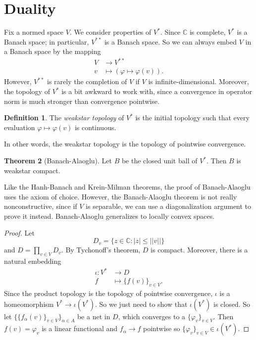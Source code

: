 \documentclass[12pt]{report}
\newcommand{\CC}{\mathbb{C}}
\newcommand{\dfn}[1]{\emph{#1}\index{#1}}
\theoremstyle{definition}
\newtheorem{theorem}{Theorem}[chapter]
\newtheorem{definition}[theorem]{Definition}
\begin{document}
\section{Duality}
    Fix a normed space $V$. We consider properties of $V^*$. Since $\CC$ is complete, $V^*$ is a Banach space; in particular, $V^{**}$ is a Banach space. So we can always embed $V$ in a Banach space by the mapping
\begin{align*}
    V &\to V^{**}\\
    v &\mapsto (\varphi \mapsto \varphi(v)).
\end{align*}
    However, $V^{**}$ is rarely the completion of $V$ if $V$ is infinite-dimensional. Moreover, the topology of $V^*$ is a bit awkward to work with, since a convergence in operator norm is much stronger than convergence pointwise.
\begin{definition}
    The \dfn{weakstar topology} of $V^*$ is the initial topology such that every evaluation $\varphi \mapsto \varphi(v)$ is continuous.
\end{definition}
    In other words, the weakstar topology is the topology of pointwise convergence.
\begin{theorem}[Banach-Alaoglu]
    Let $B$ be the closed unit ball of $V^*$. Then $B$ is weakstar compact.
\end{theorem}
    Like the Hanh-Banach and Krein-Milman theorems, the proof of Banach-Alaoglu uses the axiom of choice. However, the Banach-Alaoglu theorem is not really nonconstructive, since if $V$ is separable, we can use a diagonalization argument to prove it instead. Banach-Alaoglu generalizes to locally convex spaces.
\begin{proof}
    Let
    $$D_v = \{z \in \CC: |z| \leq ||v||\}$$
    and $D = \prod_{v \in V} D_v$. By Tychonoff's theorem, $D$ is compact. Moreover, there is a natural embedding
\begin{align*}
    \iota: V^* &\to D\\
    f &\mapsto \{f(v)\}_{v \in V}.
\end{align*}
    Since the product topology is the topology of pointwise convergence, $\iota$ is a homeomorphism $V^* \to \iota(V^*)$. So we just need to show that $\iota(V^*)$ is closed. So let $\{\{f_\alpha(v)\}_{v \in V}\}_{\alpha \in A}$ be a net in $D$, which converges to a $\{\varphi_v\}_{v \in V}$. Then $f(v) = \varphi_v$ is a linear functional and $f_\alpha \to f$ pointwise so $\{\varphi_v\}_{v \in V} \in \iota(V^*)$.
\end{proof}
\end{document}
